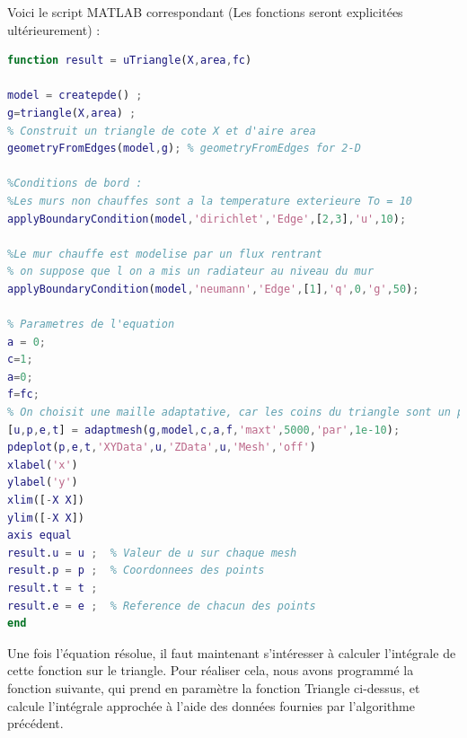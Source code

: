 \documentclass[a4paper,reqno]{article}
\begin{document}
Voici le script MATLAB correspondant (Les fonctions seront explicitées ultérieurement) :
\vspace{0.5cm}



\begin{lstlisting}[language=Matlab,frame=single,caption=Resolution d'une EDP sur un triangle]
function result = uTriangle(X,area,fc)

model = createpde() ; 
g=triangle(X,area) ; 
% Construit un triangle de cote X et d'aire area
geometryFromEdges(model,g); % geometryFromEdges for 2-D

%Conditions de bord : 
%Les murs non chauffes sont a la temperature exterieure To = 10
applyBoundaryCondition(model,'dirichlet','Edge',[2,3],'u',10);

%Le mur chauffe est modelise par un flux rentrant 
% on suppose que l on a mis un radiateur au niveau du mur 
applyBoundaryCondition(model,'neumann','Edge',[1],'q',0,'g',50);

% Parametres de l'equation
a = 0;
c=1;
a=0;
f=fc;
% On choisit une maille adaptative, car les coins du triangle sont un probleme
[u,p,e,t] = adaptmesh(g,model,c,a,f,'maxt',5000,'par',1e-10);
pdeplot(p,e,t,'XYData',u,'ZData',u,'Mesh','off')
xlabel('x')
ylabel('y')
xlim([-X X])
ylim([-X X])
axis equal
result.u = u ;  % Valeur de u sur chaque mesh
result.p = p ;  % Coordonnees des points 
result.t = t ;
result.e = e ;  % Reference de chacun des points 
end
\end{lstlisting}
\vspace{0.5cm}
Une fois l'équation résolue, il faut maintenant s'intéresser à calculer l'intégrale de cette fonction sur le triangle. Pour réaliser cela, nous avons programmé la fonction suivante, qui prend en paramètre la fonction Triangle ci-dessus, et calcule l'intégrale approchée à l'aide des données fournies par l'algorithme précédent.
\end{document}
